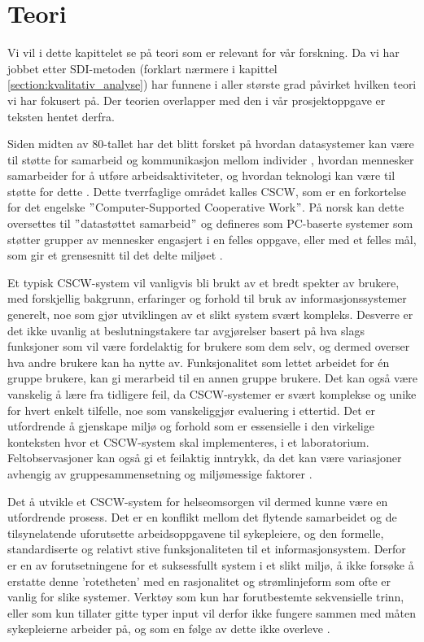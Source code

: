 \chapter{Teori}
\label{chp:teori} 

Vi vil i dette kapittelet se på teori som er relevant for vår forskning. Da vi har jobbet etter SDI-metoden (forklart nærmere i kapittel \ref{section:kvalitativ_analyse}) har funnene i aller største grad påvirket hvilken teori vi har fokusert på. Der teorien overlapper med den i vår prosjektoppgave \citep{Sund13} er teksten hentet derfra. 

\noindent
Siden midten av 80-tallet har det blitt forsket på hvordan datasystemer kan være til støtte for samarbeid og kommunikasjon mellom individer \citep{Rogers94}, hvordan mennesker samarbeider for å utføre arbeidsaktiviteter, og hvordan teknologi kan være til støtte for dette \citep{Ellis91}. Dette tverrfaglige området kalles CSCW, som er en forkortelse for det engelske $"$Computer-Supported Cooperative Work$"$. På norsk kan dette oversettes til $"$datastøttet samarbeid$"$ og defineres som PC-baserte systemer som støtter grupper av mennesker engasjert i en felles oppgave, eller med et felles mål, som gir et grensesnitt til det delte miljøet \citep{Ellis91}.

\noindent
Et typisk CSCW-system vil vanligvis bli brukt av et bredt spekter av brukere, med forskjellig bakgrunn, erfaringer og forhold til bruk av informasjonssystemer generelt, noe som gjør utviklingen av et slikt system svært kompleks. Desverre er det ikke uvanlig at beslutningstakere tar avgjørelser basert på hva slags funksjoner som vil være fordelaktig for brukere som dem selv, og dermed overser hva andre brukere kan ha nytte av. Funksjonalitet som lettet arbeidet for én gruppe brukere, kan gi merarbeid til en annen gruppe brukere. Det kan også være vanskelig å lære fra tidligere feil, da CSCW-systemer er svært komplekse og unike for hvert enkelt tilfelle, noe som vanskeliggjør evaluering i ettertid. Det er utfordrende å gjenskape miljø og forhold som er essensielle i den virkelige konteksten hvor et CSCW-system skal implementeres, i et laboratorium. Feltobservasjoner kan også gi et feilaktig inntrykk, da det kan være variasjoner avhengig av gruppesammensetning og miljømessige faktorer \citep{Berg99}.


\noindent
Det å utvikle et CSCW-system for helseomsorgen vil dermed kunne være en utfordrende prosess. Det er en konflikt mellom det flytende samarbeidet og de tilsynelatende uforutsette arbeidsoppgavene til sykepleiere, og den formelle, standardiserte og relativt stive funksjonaliteten til et informasjonsystem. Derfor er en av forutsetningene for et suksessfullt system i et slikt miljø, å ikke forsøke å erstatte denne 'rotetheten' med en rasjonalitet og strømlinjeform som ofte er vanlig for slike systemer. Verktøy som kun har forutbestemte sekvensielle trinn, eller som kun tillater gitte typer input vil derfor ikke fungere sammen med måten sykepleierne arbeider på, og som en følge av dette ikke overleve \citep{Berg99}.